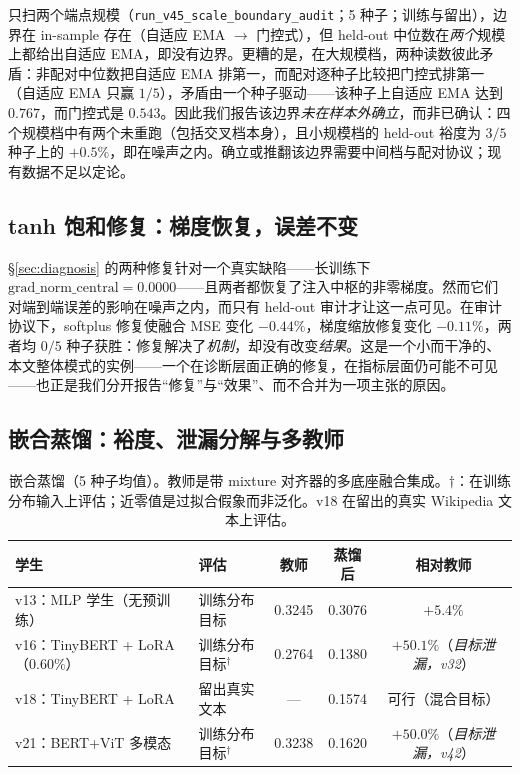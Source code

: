 \documentclass[10pt,twoside]{article}
\theoremstyle{definition}
\theoremstyle{plain}
\theoremstyle{remark}
\begin{document}
只扫两个端点规模（\texttt{run\_v45\_scale\_boundary\_audit}；5 种子；训练与留出），边界在 in-sample 存在（自适应 EMA $\rightarrow$ 门控式），但 held-out 中位数在\emph{两个}规模上都给出自适应 EMA，即没有边界。更糟的是，在大规模档，两种读数彼此矛盾：非配对中位数把自适应 EMA 排第一，而配对逐种子比较把门控式排第一（自适应 EMA 只赢 $1/5$），矛盾由一个种子驱动——该种子上自适应 EMA 达到 $0.767$，而门控式是 $0.543$。因此我们报告该边界\emph{未在样本外确立}，而非已确认：四个规模档中有两个未重跑（包括交叉档本身），且小规模档的 held-out 裕度为 $3/5$ 种子上的 $+0.5\%$，即在噪声之内。确立或推翻该边界需要中间档与配对协议；现有数据不足以定论。

\subsection{tanh 饱和修复：梯度恢复，误差不变}
\label{sec:repair-exp}

\S\ref{sec:diagnosis} 的两种修复针对一个真实缺陷——长训练下 $\text{grad\_norm\_central} = 0.0000$——且两者都恢复了注入中枢的非零梯度。然而它们对端到端误差的影响在噪声之内，而只有 held-out 审计才让这一点可见。在审计协议下，softplus 修复使融合 MSE 变化 $-0.44\%$，梯度缩放修复变化 $-0.11\%$，两者均 $0/5$ 种子获胜：修复解决了\emph{机制}，却没有改变\emph{结果}。这是一个小而干净的、本文整体模式的实例——一个在诊断层面正确的修复，在指标层面仍可能不可见——也正是我们分开报告``修复''与``效果''、而不合并为一项主张的原因。

\subsection{嵌合蒸馏：裕度、泄漏分解与多教师}
\label{sec:distill-exp}

\begin{table}[htbp]
\centering
\caption{嵌合蒸馏（5 种子均值）。教师是带 mixture 对齐器的多底座融合集成。$\dagger$：在训练分布输入上评估；近零值是过拟合假象而非泛化。v18 在留出的真实 Wikipedia 文本上评估。}
\label{tab:distill}
\small
\setlength{\tabcolsep}{4.5pt}
\begin{tabular}{llccc}
\toprule
\textbf{学生} & \textbf{评估} & \textbf{教师} & \textbf{蒸馏后} & \textbf{相对教师} \\
\midrule
v13：MLP 学生（无预训练） & 训练分布目标 & 0.3245 & 0.3076 & $+5.4\%$ \\
v16：TinyBERT + LoRA（$0.60\%$） & 训练分布目标$^\dagger$ & 0.2764 & 0.1380 & $+50.1\%$（\emph{目标泄漏，v32}） \\
v18：TinyBERT + LoRA & 留出真实文本 & --- & 0.1574 & 可行（混合目标） \\
v21：BERT+ViT 多模态 & 训练分布目标$^\dagger$ & 0.3238 & 0.1620 & $+50.0\%$（\emph{目标泄漏，v42}） \\
\bottomrule
\end{tabular}
\end{table}
\end{document}
